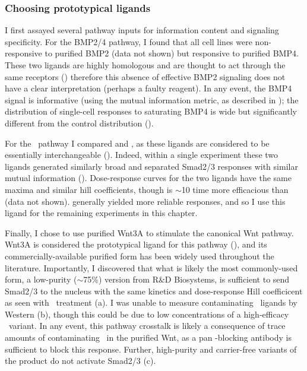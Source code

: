 \subsubsection{Choosing prototypical ligands}
 
I first assayed several pathway inputs for information
content and signaling specificity. For the BMP2/4 pathway, I found that
all cell lines were non-responsive to purified BMP2 (data not shown) but
responsive to purified BMP4. These two ligands are
highly homologous and are thought to act through the same receptors
() therefore this absence of effective BMP2
signaling does not have a clear interpretation (perhaps a faulty reagent). In any event, the 
BMP4 signal is informative (using the mutual information metric,
as described in );
the distribution of single-cell responses to saturating BMP4 is wide
but significantly different from the control distribution 
(). 


For the \tgf\ pathway I compared  and , as these ligands
are considered to be essentially interchangeable
(). Indeed, within a single experiment
these two ligands generated similarly broad and separated Smad2/3
responses with similar mutual information
(). Dose-response curves for
the two ligands have the same
maxima and similar hill coefficients, though  is $\sim$10 time more
efficacious than  (data not shown).
 generally yielded more reliable responses, and so I use this
ligand for the remaining experiments in this chapter.


Finally, I chose to use purified Wnt3A to stimulate the canonical
Wnt pathway. Wnt3A is considered the prototypical ligand for this
pathway (), and its commercially-available
purified form has been widely used throughout the literature.
Importantly, I discovered that what is likely the most
commonly-used form, a low-purity ($\sim$75\%)
version from R\&D Biosystems, is sufficient to send Smad2/3 to the nucleus with the same
kinetics and dose-response Hill coefficicent as seen with \tgf\ treatment
(a). I was unable to measure contaminating \tgf\ ligands
by Western (b),
though this could be due to low concentrations of a high-efficacy \tgf\ variant.
In any event, this pathway crosstalk is likely
a consequence of trace amounts of contaminating \tgf\ in
the purified Wnt, as a pan \tgf-blocking antibody is sufficient to
block this response. Further, high-purity and carrier-free variants of the
product do not activate Smad2/3 (c).



